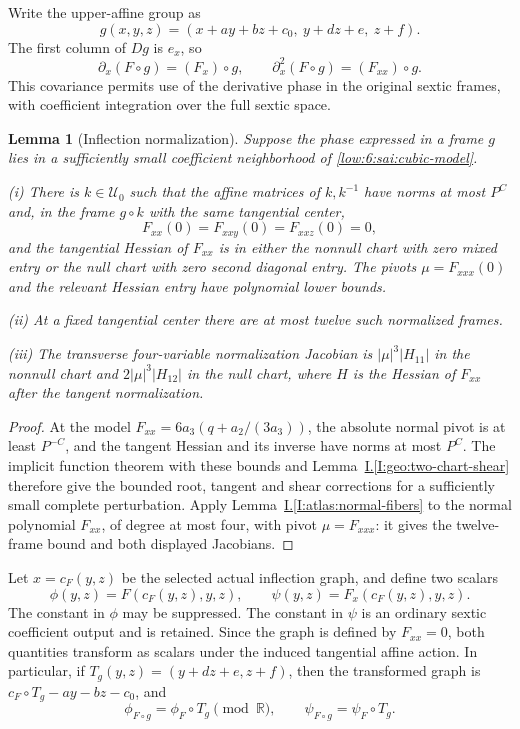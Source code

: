 \documentclass[11pt]{amsart}
\newtheorem{lemma}[theorem]{Lemma}
\theoremstyle{definition}
\theoremstyle{remark}
\numberwithin{equation}{section}
\newcommand{\partIref}[1]{\hyperref[I:#1]{I.\ref*{I:#1}}}
\begin{document}
Write the upper-affine group as
\[
g(x,y,z)=(x+ay+bz+c_0,\ y+dz+e,\ z+f).
\]
The first column of $Dg$ is $e_x$, so
\begin{equation}\label{low:6:sai:derivative-covariance}
\partial_x(F\circ g)=(F_x)\circ g,\qquad \partial_x^2(F\circ g)=(F_{xx})\circ g.
\end{equation}
This covariance permits use of the derivative phase in the original sextic frames, with coefficient integration over the full sextic space.

\begin{lemma}[Inflection normalization]\label{low:6:sai:inflection-normalization}
Suppose the phase expressed in a frame $g$ lies in a sufficiently small coefficient neighborhood of \eqref{low:6:sai:cubic-model}.

\noindent\textup{(i)} There is $k\in\mathcal U_0$ such that the affine matrices of $k,k^{-1}$ have norms at most $P^C$ and, in the frame $g\circ k$ with the same tangential center,
\[
F_{xx}(0)=F_{xxy}(0)=F_{xxz}(0)=0,
\]
and the tangential Hessian of $F_{xx}$ is in either the nonnull chart with zero mixed entry or the null chart with zero second diagonal entry. The pivots $\mu=F_{xxx}(0)$ and the relevant Hessian entry have polynomial lower bounds.

\noindent\textup{(ii)} At a fixed tangential center there are at most twelve such normalized frames.

\noindent\textup{(iii)} The transverse four-variable normalization Jacobian is $|\mu|^3|H_{11}|$ in the nonnull chart and $2|\mu|^3|H_{12}|$ in the null chart, where $H$ is the Hessian of $F_{xx}$ after the tangent normalization.
\end{lemma}
\begin{proof}
At the model $F_{xx}=6a_3(q+a_2/(3a_3))$, the absolute normal pivot is at least $P^{-C}$, and the tangent Hessian and its inverse have norms at most $P^C$. The implicit function theorem with these bounds and Lemma~\partIref{geo:two-chart-shear} therefore give the bounded root, tangent and shear corrections for a sufficiently small complete perturbation. Apply Lemma~\partIref{atlas:normal-fibers} to the normal polynomial $F_{xx}$, of degree at most four, with pivot $\mu=F_{xxx}$: it gives the twelve-frame bound and both displayed Jacobians.
\end{proof}

Let $x=c_F(y,z)$ be the selected actual inflection graph, and define two scalars
\begin{equation}\label{low:6:sai:two-scalars}
\phi(y,z)=F(c_F(y,z),y,z),\qquad \psi(y,z)=F_x(c_F(y,z),y,z).
\end{equation}
The constant in $\phi$ may be suppressed. The constant in $\psi$ is an ordinary sextic coefficient output and is retained. Since the graph is defined by $F_{xx}=0$, both quantities transform as scalars under the induced tangential affine action. In particular, if $T_g(y,z)=(y+dz+e,z+f)$, then the transformed graph is $c_F\circ T_g-ay-bz-c_0$, and
\begin{equation}\label{low:6:sai:scalar-covariance}
\phi_{F\circ g}=\phi_F\circ T_g\pmod{\mathbb R},\qquad \psi_{F\circ g}=\psi_F\circ T_g.
\end{equation}
\end{document}
